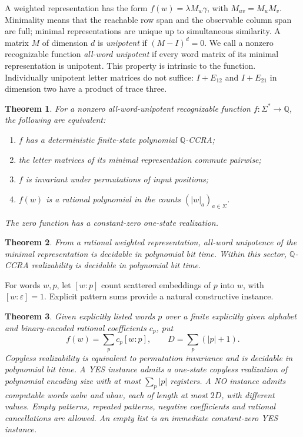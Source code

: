 \documentclass[acmlarge,screen,11pt,nonacm]{acmart}
\newcommand{\Q}{\mathbb{Q}}
\newcommand{\eps}{\varepsilon}
\newtheorem{theorem}{Theorem}
\theoremstyle{definition}
\begin{document}
A weighted representation has the form $f(w)=\lambda M_w\gamma$, with $M_{uv}=M_uM_v$. Minimality means that the reachable row span and the observable column span are full; minimal representations are unique up to simultaneous similarity. A matrix $M$ of dimension $d$ is \emph{unipotent} if $(M-I)^d=0$. We call a nonzero recognizable function \emph{all-word unipotent} if every word matrix of its minimal representation is unipotent. This property is intrinsic to the function. Individually unipotent letter matrices do not suffice: $I+E_{12}$ and $I+E_{21}$ in dimension two have a product of trace three.

\begin{theorem}\label{thm:characterization}
For a nonzero all-word-unipotent recognizable function $f:\Sigma^*\to\Q$, the following are equivalent:
\begin{enumerate}
\item $f$ has a deterministic finite-state polynomial $\Q$-CCRA;
\item the letter matrices of its minimal representation commute pairwise;
\item $f$ is invariant under permutations of input positions;
\item $f(w)$ is a rational polynomial in the counts $(|w|_a)_{a\in\Sigma}$.
\end{enumerate}
The zero function has a constant-zero one-state realization.
\end{theorem}

\begin{theorem}\label{thm:decision}
From a rational weighted representation, all-word unipotence of the minimal representation is decidable in polynomial bit time. Within this sector, $\Q$-CCRA realizability is decidable in polynomial bit time.
\end{theorem}

For words $w,p$, let $[w:p]$ count scattered embeddings of $p$ into $w$, with $[w:\eps]=1$. Explicit pattern sums provide a natural constructive instance.
\begin{theorem}\label{thm:patterns}
Given explicitly listed words $p$ over a finite explicitly given alphabet and binary-encoded rational coefficients $c_p$, put
\[
 f(w)=\sum_p c_p[w:p],\qquad D=\sum_p(|p|+1).
\]
Copyless realizability is equivalent to permutation invariance and is decidable in polynomial bit time. A YES instance admits a one-state copyless realization of polynomial encoding size with at most $\sum_p|p|$ registers. A NO instance admits computable words $uabv$ and $ubav$, each of length at most $2D$, with different values. Empty patterns, repeated patterns, negative coefficients and rational cancellations are allowed. An empty list is an immediate constant-zero YES instance.
\end{theorem}
\end{document}
